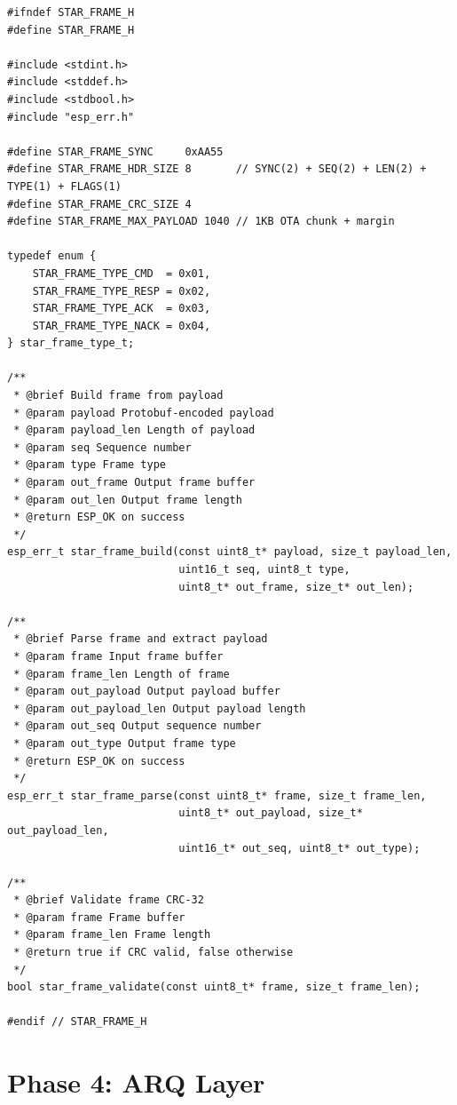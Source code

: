 \begin{lstlisting}[caption={star\_frame.h - Frame Layer Interface}]
#ifndef STAR_FRAME_H
#define STAR_FRAME_H

#include <stdint.h>
#include <stddef.h>
#include <stdbool.h>
#include "esp_err.h"

#define STAR_FRAME_SYNC     0xAA55
#define STAR_FRAME_HDR_SIZE 8       // SYNC(2) + SEQ(2) + LEN(2) + TYPE(1) + FLAGS(1)
#define STAR_FRAME_CRC_SIZE 4
#define STAR_FRAME_MAX_PAYLOAD 1040 // 1KB OTA chunk + margin

typedef enum {
    STAR_FRAME_TYPE_CMD  = 0x01,
    STAR_FRAME_TYPE_RESP = 0x02,
    STAR_FRAME_TYPE_ACK  = 0x03,
    STAR_FRAME_TYPE_NACK = 0x04,
} star_frame_type_t;

/**
 * @brief Build frame from payload
 * @param payload Protobuf-encoded payload
 * @param payload_len Length of payload
 * @param seq Sequence number
 * @param type Frame type
 * @param out_frame Output frame buffer
 * @param out_len Output frame length
 * @return ESP_OK on success
 */
esp_err_t star_frame_build(const uint8_t* payload, size_t payload_len,
                           uint16_t seq, uint8_t type,
                           uint8_t* out_frame, size_t* out_len);

/**
 * @brief Parse frame and extract payload
 * @param frame Input frame buffer
 * @param frame_len Length of frame
 * @param out_payload Output payload buffer
 * @param out_payload_len Output payload length
 * @param out_seq Output sequence number
 * @param out_type Output frame type
 * @return ESP_OK on success
 */
esp_err_t star_frame_parse(const uint8_t* frame, size_t frame_len,
                           uint8_t* out_payload, size_t* out_payload_len,
                           uint16_t* out_seq, uint8_t* out_type);

/**
 * @brief Validate frame CRC-32
 * @param frame Frame buffer
 * @param frame_len Frame length
 * @return true if CRC valid, false otherwise
 */
bool star_frame_validate(const uint8_t* frame, size_t frame_len);

#endif // STAR_FRAME_H
\end{lstlisting}

\section{Phase 4: ARQ Layer}

